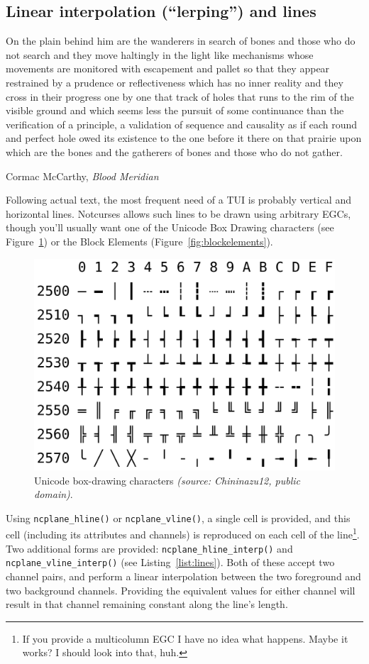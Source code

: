 \documentclass[letterpaper,10pt]{article}
\begin{document}
\subsection{Linear interpolation (``lerping'') and lines}
\epigraph{On the plain behind him are the wanderers in search of bones and those who do not search and they move haltingly in the light like mechanisms whose movements are monitored with escapement and pallet so that they appear restrained by a prudence or reflectiveness which has no inner reality and they cross in their progress one by one that track of holes that runs to the rim of the visible ground and which seems less the pursuit of some continuance than the verification of a principle, a validation of sequence and causality as if each round and perfect hole owed its existence to the one before it there on that prairie upon which are the bones and the gatherers of bones and those who do not gather.}{Cormac McCarthy, \textit{Blood Meridian}}
\label{sec:lerps}
Following actual text, the most frequent need of a TUI is probably vertical
and horizontal lines. Notcurses allows such lines to be drawn using arbitrary
EGCs, though you'll usually want one of the Unicode Box Drawing characters
(see Figure~\ref{fig:linedrawing}) or the Block Elements
(Figure~\ref{fig:blockelements}).

\begin{figure}[!htb]
    \centering
    \includegraphics[width=.75\linewidth]{media/boxdrawing.png}
    \caption{Unicode box-drawing characters \textit{(source: Chininazu12, public domain)}.}
    \label{fig:linedrawing}
\end{figure}

Using \texttt{ncplane\_hline()} or \texttt{ncplane\_vline()}, a single cell is
provided, and this cell (including its attributes and channels) is reproduced
on each cell of the line\footnote{If you provide a multicolumn EGC\textellipsis
I have no idea what happens. Maybe it works? I should look into that, huh.}.
Two additional forms are provided: \texttt{ncplane\_hline\_interp()} and
\texttt{ncplane\_vline\_interp()} (see Listing~\ref{list:lines}). Both of these
accept two channel pairs, and perform a linear interpolation between the two
foreground and two background channels. Providing the equivalent values for
either channel will result in that channel remaining constant along the line's
length.
\end{document}
